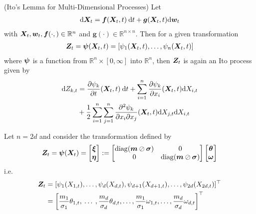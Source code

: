 \documentclass[11pt,twoside,a4paper]{article}
\begin{document}
\begin{thm} {(Ito's Lemma for Multi-Dimensional Processes)} \label{multivariateItoLemma}
Let 
\begin{align}
    {\rm{d}} {\bm{X}}_t = {\bm{f}}({\bm{X}}_t,t) \: {\rm{d}} t + \bm{g}({\bm{X}}_t,t) {\rm{d}}\bm{w}_t
\end{align}
with ${\bm{X}}_t,\bm{w}_t,{\bm{f}}(\cdot,) \in \mathbb{R}^n$ and $\bm{g}(\cdot) \in \mathbb{R}^{n \times n}$. Then for a given transformation 
\begin{align}
    {\bm{Z}}_t = \bm{\psi}({\bm{X}}_t,t) =[\psi_1({\bm{X}}_t,t),\dots,\psi_n({\bm{X}}_t,t)]
\end{align}
where ${\bm{\psi}}$ is a function from $\mathbb{R}^n\times [0,\infty]$ into $\mathbb{R}^n$, then ${\bm{Z}}_t$ is again an Ito process given by 
\begin{align} \label{Itorule}
    {\rm{d}} Z_{k,t} &= \frac{\partial \psi_k}{\partial t}({\bm{X}}_t,t) \: {\rm{d}} t + \sum_{i=1}^n \frac{\partial \psi_k}{\partial x_i}({\bm{X}}_t,t) {\rm{d}} X_{i,t} \nonumber  \\ 
    &+ \frac{1}{2} \sum_{i=1}^n \sum_{j=1}^n \frac{\partial^2  \psi_k}{\partial x_i \partial x_j}({\bm{X}}_t,t) {\rm{d}} X_{j,t} {\rm{d}} X_{i,t} 
\end{align}
\end{thm}
\begin{thm}
Let $n=2d$ and consider the transformation defined by 
\begin{align} \label{Itotransformation}
{\bm{Z}}_t={\bm{\psi}}({\bm{X}}_t)=\begin{bmatrix}
{\bm{\xi}} \\ 
{\bm{\eta}}
\end{bmatrix}
: = \begin{bmatrix}
{\rm{diag}}({\bm{m}} \oslash {\bm{\sigma}}) & 0 \\ 
0 & {\rm{diag}}({\bm{m}} \oslash {\bm{\sigma}})
\end{bmatrix}
\begin{bmatrix}
{\bm{\theta}} \\ 
{\bm{\omega}} 
\end{bmatrix}
\end{align} i.e.
\begin{align}
    {\bm{Z}}_t&= [\psi_1(X_{1,t}),\dots,\psi_d(X_{d,t}), \psi_{d+1}(X_{d+1,t}), \dots, \psi_{2d}(X_{2d,t})]^{\top} \nonumber \\     & =\left[\frac{m_1}{\sigma_1}\theta_{1,t},\:\dots\:,\frac{m_d}{\sigma_d}\theta_{d,t} ,  \dots , \frac{m_1}{\sigma_1} \omega_{1,t} , \dots,\frac{m_d}{\sigma_d} \omega_{d,t} \right]^{\top}
\end{align}
\end{thm}
\end{document}
